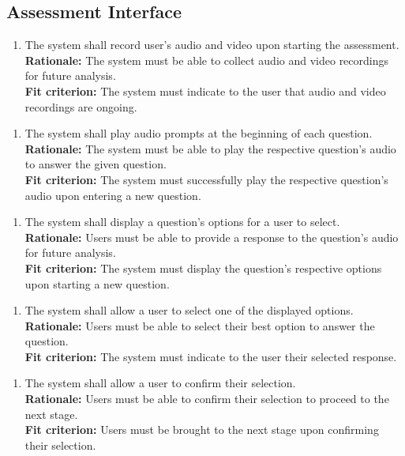\documentclass[12pt]{article}
\begin{document}
\newpage

\subsection{Assessment Interface}
\begin{enumerate}[label={FR-AI}1. ]
  \item The system shall record user's audio and video upon starting the assessment.\\
  \textbf{Rationale: }The system must be able to collect audio and video recordings for future analysis.\\
  \textbf{Fit criterion: }The system must indicate to the user that audio and video recordings are ongoing.  
\end{enumerate}
\begin{enumerate}[label={FR-AI}2. ]
  \item The system shall play audio prompts at the beginning of each question.\\
  \textbf{Rationale: }The system must be able to play the respective question's audio to answer the given question.\\
  \textbf{Fit criterion: }The system must successfully play the respective question's audio upon entering a new question.
\end{enumerate}
\begin{enumerate}[label={FR-AI}3. ]
  \item The system shall display a question's options for a user to select.\\
  \textbf{Rationale: }Users must be able to provide a response to the question's audio for future analysis.\\
  \textbf{Fit criterion: }The system must display the question's respective options upon starting a new question.
\end{enumerate}
\begin{enumerate}[label={FR-AI}4. ]
  \item The system shall allow a user to select one of the displayed options.\\
  \textbf{Rationale: }Users must be able to select their best option to answer the question.\\
  \textbf{Fit criterion: }The system must indicate to the user their selected response.
\end{enumerate}
\begin{enumerate}[label={FR-AI}5. ]
  \item The system shall allow a user to confirm their selection.\\
  \textbf{Rationale: }Users must be able to confirm their selection to proceed to the next stage.\\
  \textbf{Fit criterion: }Users must be brought to the next stage upon confirming their selection.
\end{enumerate}
\end{document}

